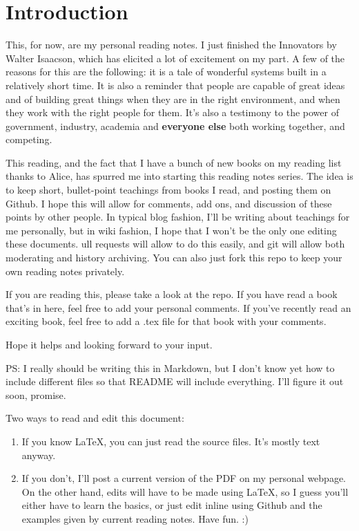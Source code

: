 \section{Introduction}

This, for now, are my personal reading notes.
I just finished the Innovators by Walter Isaacson, which has elicited a lot of excitement on my part.
A few of the reasons for this are the following: it is a tale of wonderful systems built in a relatively short time.
It is also a reminder that people are capable of great ideas and of building great things when they are in the right environment, and when they work with the right people for them.
It's also a testimony to the power of government, industry, academia and \textbf{everyone else} both working together, and competing.

This reading, and the fact that I have a bunch of new books on my reading list thanks to Alice, has spurred me into starting this reading notes series.
The idea is to keep short, bullet-point teachings from books I read, and posting them on Github.
I hope this will allow for comments, add ons, and discussion of these points by other people. In typical blog fashion, I'll be writing about teachings for me personally, but in wiki fashion, I hope that I won't be the only one editing these documents. 
ull requests will allow to do this easily, and git will allow both moderating and history archiving.
You can also just fork this repo to keep your own reading notes privately.

If you are reading this, please take a look at the repo.
If you have read a book that's in here, feel free to add your personal comments.
If you've recently read an exciting book, feel free to add a .tex file for that book with your comments.

Hope it helps and looking forward to your input.

PS: I really should be writing this in Markdown, but I don't know yet how to include different files so that README will include everything.
I'll figure it out soon, promise.

Two ways to read and edit this document:

\begin{enumerate}
    \item If you know LaTeX, you can just read the source files.
    It's mostly text anyway.
    \item If you don't, I'll post a current version of the PDF on my personal webpage.
    On the other hand, edits will have to be made using LaTeX, so I guess you'll either have to learn the basics, or just edit inline using Github and the examples given by current reading notes.
    Have fun. :)
\end{enumerate}

